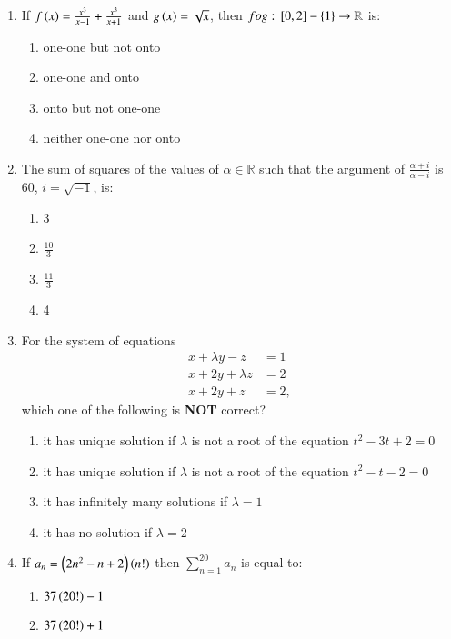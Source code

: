 \documentclass[journal]{IEEEtran}
\begin{document}
\begin{enumerate}
\item If $f\left(x\right) = \frac{x^3}{x-1} + \frac{x^3}{x+1}$ and $g\left(x\right) = \sqrt{x}$, then $fog: {}\left[0, 2\right]-\{1\}\rightarrow\mathbb{R}$ is:
    \begin{enumerate}
        \item one-one but not onto
        \item one-one and onto
        \item onto but not one-one
        \item neither one-one nor onto \\
    \end{enumerate}
\item The sum of squares of the values of $\alpha\in\mathbb{R}$ such that the argument of $\frac{\alpha+i}{\alpha-i}$ is 60\degree, $i=\sqrt{-1}$, is:
\begin{enumerate}
    \item 3
    \item $\frac{10}{3}$
    \item $\frac{11}{3}$
    \item 4 \\
\end{enumerate}
\item For the system of equations
\begin{align*}
    x + \lambda y - z & = 1 \\
    x + 2y + \lambda z & = 2 \\
    x + 2y + z & = 2,
\end{align*}
which one of the following is \textbf{NOT} correct? 
\begin{enumerate}
    \item it has unique solution if $\lambda$ is not a root of the equation $t^2 - 3t + 2 = 0$
    \item it has unique solution if $\lambda$ is not a root of the equation $t^2 - t - 2 = 0$
    \item it has infinitely many solutions if $\lambda = 1$
    \item it has no solution if $\lambda = 2$ \\
\end{enumerate}
 \item If $a_n = \left(2n^2 - n + 2\right)\left(n!\right)$ then $\sum\limits_{n=1}^{20}a_n$ is equal to:
 \begin{enumerate}
     \item $37 \left(20!\right) - 1$
     \item $37 \left(20!\right) + 1$

\end{enumerate}
\end{enumerate}
\end{document}
